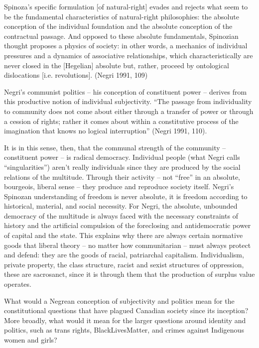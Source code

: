 \documentclass[12pt,oneside]{memoir}
\begin{document}
Spinoza's specific formulation [of natural-right] evades and rejects what seem to be the fundamental characteristics of natural-right philosophies: the absolute conception of the individual foundation and the absolute conception of the contractual passage. And opposed to these absolute fundamentals, Spinozian thought proposes a physics of society: in other words, a mechanics of individual pressures and a dynamics of associative relationships, which characteristically are never closed in the [Hegelian] absolute but, rather, proceed by ontological dislocations [i.e. revolutions]. (Negri 1991, 109)

Negri's communist politics -- his conception of constituent power -- derives from this productive notion of individual subjectivity. ``The passage from individuality to community does not come about either through a transfer of power or through a cession of rights; rather it comes about within a constitutive process of the imagination that knows no logical interruption'' (Negri 1991, 110). 

	It is in this sense, then, that the communal strength of the community -- constituent power -- is radical democracy. Individual people (what Negri calls ``singularities'') aren't really individuals since they are produced by the social relations of the multitude. Through their activity -- not ``free'' in an absolute, bourgeois, liberal sense -- they produce and reproduce society itself. Negri's Spinozan understanding of freedom is never absolute, it is freedom according to historical, material, and social necessity. For Negri, the absolute, unbounded democracy of the multitude is always faced with the necessary constraints of history and the artificial compulsion of the foreclosing and antidemocratic power of capital and the state. This explains why there are always certain normative goods that liberal theory -- no matter how communitarian -- must always protect and defend: they are the goods of racial, patriarchal capitalism. Individualism, private property, the class structure, racist and sexist structures of oppression, these are sacrosanct, since it is through them that the production of surplus value operates. 

What would a Negrean conception of subjectivity and politics mean for the constitutional questions that have plagued Canadian society since its inception? More broadly, what would it mean for the larger questions around identity and politics, such as trans rights, BlackLivesMatter, and crimes against Indigenous women and girls?
\end{document}
